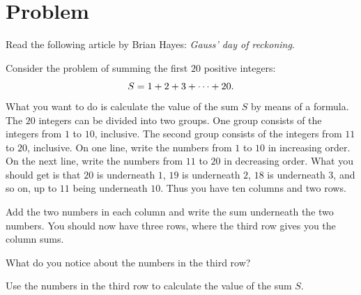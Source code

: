 \documentclass[a4paper,oneside,12pt]{article}
\begin{document}
\section*{Problem}

\begin{problem}
\item Read the following article by Brian Hayes:
  \emph{Gauss' day of reckoning}.

\item\label{prob:sum_even_number_of_terms_20}
  Consider the problem of summing the first $20$ positive integers:
  \[
  S
  =
  {1 + 2} + {3} + \cdots + {20}.
  \]
  What you want to do is calculate the value of the sum $S$ by means
  of a formula.  The $20$ integers can be divided into two groups.
  One group consists of the integers from $1$ to $10$, inclusive.  The
  second group consists of the integers from $11$ to $20$, inclusive.
  On one line, write the numbers from $1$ to $10$ in increasing order.
  On the next line, write the numbers from $11$ to $20$ in decreasing
  order.  What you should get is that $20$ is underneath $1$, $19$ is
  underneath $2$, $18$ is underneath $3$, and so on, up to $11$ being
  underneath $10$.  Thus you have ten columns and two rows.
  \begin{packedenum}
  \item\label{subprob:sum_even_number_add_column}
    Add the two numbers in each column and write the sum underneath
    the two numbers.  You should now have three rows, where the third
    row gives you the column sums.

  \item\label{subprob:sum_even_number_observation}
    What do you notice about the numbers in the third row?

  \item\label{subprob:sum_even_number_sum}
    Use the numbers in the third row to calculate the value of the sum
    $S$.
  \end{packedenum}
\end{problem}
\end{document}
